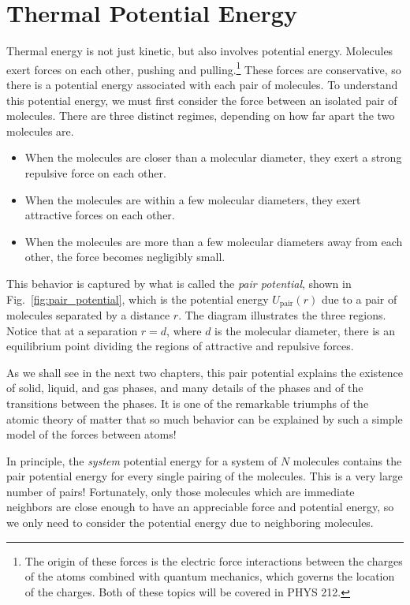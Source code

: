 \section{Thermal Potential Energy}

Thermal energy is not just kinetic, but also involves potential
energy.  Mole\-cules exert forces on each other, pushing and
pulling.\footnote{The origin of these forces is the electric force
  interactions between the charges of the atoms combined with quantum
  mechanics, which governs the location of the charges.  Both of these
  topics will be covered in PHYS 212.}  These forces are conservative,
so there is a potential energy associated with each pair of molecules.
To understand this potential energy, we must first consider the force
between an isolated pair of molecules.  There are three distinct
regimes, depending on how far apart the two molecules are.
\begin{itemize}
\item When the molecules are closer than a molecular diameter, they
exert a strong repulsive force on each other.
\item When the molecules are within a few molecular diameters, they
exert attractive forces on each other.
\item When the molecules are more than a few molecular diameters away
from each other, the force becomes negligibly small.
\end{itemize}

This behavior is captured by what is called the {\it pair
  potential\/}, shown in Fig.~\ref{fig:pair_potential}, which is the
potential energy $U_\text{pair}(r)$ due to a pair of molecules
separated by a distance $r$.  The diagram illustrates the three
regions.  Notice that at a separation $r=d$, where $d$ is the
molecular diameter, there is an equilibrium point dividing the regions
of attractive and repulsive forces.

As we shall see in the next two chapters, this pair potential explains
the existence of solid, liquid, and gas phases, and many details of
the phases and of the transitions between the phases.  It is one of
the remarkable triumphs of the atomic theory of matter that so much
behavior can be explained by such a simple model of the forces between
atoms!

In principle, the {\it system} potential energy for a system of $N$
molecules contains the pair potential energy for every single pairing
of the molecules.  This is a very large number of pairs!  Fortunately,
only those molecules which are immediate neighbors are close enough to
have an appreciable force and potential energy, so we only need to
consider the potential energy due to neighboring molecules.


